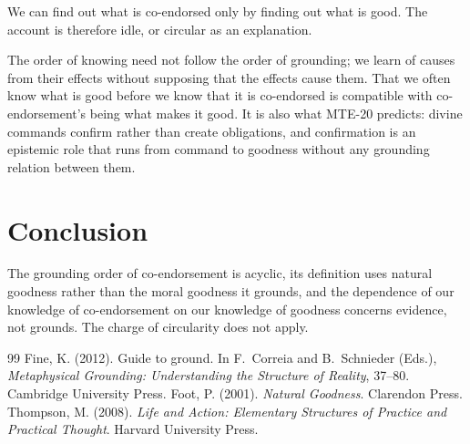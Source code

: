 \documentclass{situationist-preprint}
\begin{document}
\begin{objection}
We can find out what is co-endorsed only by finding out what is good. The account is therefore idle, or circular as an explanation.
\end{objection}

\begin{reply}
The order of knowing need not follow the order of grounding; we learn of causes from their effects without supposing that the effects cause them. That we often know what is good before we know that it is co-endorsed is compatible with co-endorsement's being what makes it good. It is also what MTE-20 predicts: divine commands confirm rather than create obligations, and confirmation is an epistemic role that runs from command to goodness without any grounding relation between them.
\end{reply}

\section{Conclusion}

The grounding order of co-endorsement is acyclic, its definition uses natural goodness rather than the moral goodness it grounds, and the dependence of our knowledge of co-endorsement on our knowledge of goodness concerns evidence, not grounds. The charge of circularity does not apply.

\begin{thebibliography}{99}\small
{} Fine, K. (2012). Guide to ground. In F.~Correia and B.~Schnieder (Eds.), \emph{Metaphysical Grounding: Understanding the Structure of Reality}, 37--80. Cambridge University Press.
 Foot, P. (2001). \emph{Natural Goodness}. Clarendon Press.
 Thompson, M. (2008). \emph{Life and Action: Elementary Structures of Practice and Practical Thought}. Harvard University Press.
\end{thebibliography}
\end{document}
